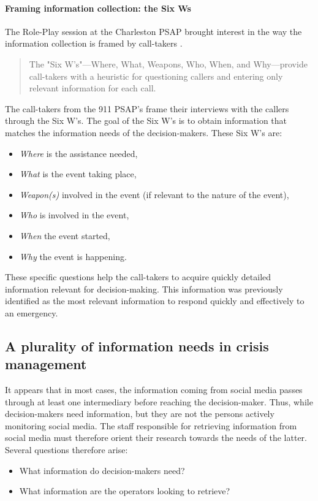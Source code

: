 \paragraph{Framing information collection: the Six Ws}
\label{sec:sixws}
The Role-Play session at the Charleston PSAP brought interest in the way the information collection is framed by call-takers \parencite{kropczynskiIdentifyingActionableInformation2018}.
\blockquote{The "Six W's"—Where, What, Weapons, Who, When, and Why—provide call-takers with a heuristic for questioning callers and entering only relevant information for each call.}
The call-takers from the 911 PSAP's frame their interviews with the callers through the Six W's.
The goal of the Six W's is to obtain information that matches the information needs of the decision-makers.
These Six W's are:

\begin{itemize}
    \item \textit{Where} is the assistance needed,
    \item \textit{What} is the event taking place,
    \item \textit{Weapon(s)} involved in the event (if relevant to the nature of the event),
    \item \textit{Who} is involved in the event,
    \item \textit{When} the event started,
    \item \textit{Why} the event is happening.
\end{itemize}

These specific questions help the call-takers to acquire quickly detailed information relevant for decision-making.
This information was previously identified as the most relevant information to respond quickly and effectively to an emergency.

\subsection{A plurality of information needs in crisis management}
It appears that in most cases, the information coming from social media passes through at least one intermediary before reaching the decision-maker.
Thus, while decision-makers need information, but they are not the persons actively monitoring social media.
The staff responsible for retrieving information from social media must therefore orient their research towards the needs of the latter.
Several questions therefore arise:

\begin{itemize}
    \item What information do decision-makers need?
    \item What information are the operators looking to retrieve?
\end{itemize}

